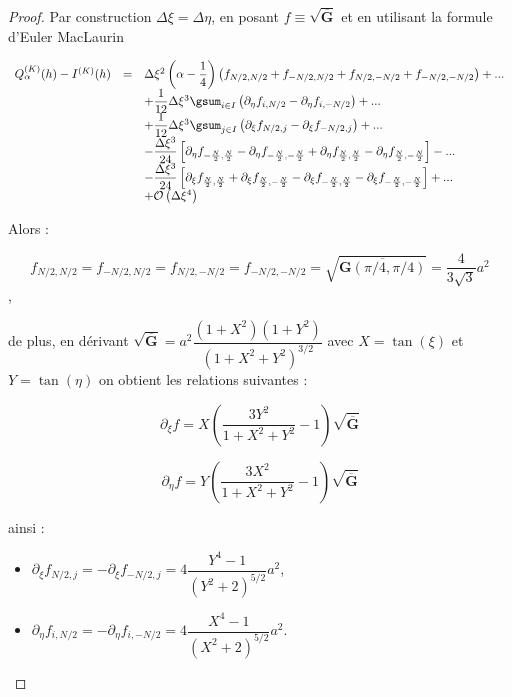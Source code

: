 \begin{proof}

Par construction $\Delta \xi = \Delta \eta$, en posant $f \equiv \sqrt{\overline{\mathbf{G}}}$ et en utilisant la formule d'Euler MacLaurin

\begin{equation}
\begin{array}{rcl}
Q_{\alpha}^{(K)}(h) - I^{(K)}(h) & = & \Delta \xi^2 \left( \alpha - \dfrac{1}{4} \right) \left( f_{N/2,N/2} + f_{-N/2,N/2} + f_{N/2,-N/2} + f_{-N/2,-N/2} \right) +  ... \\
&  & + \dfrac{1}{12} \Delta \xi ^3 \gsum_{i \in I} \left( \partial_{\eta} f_{i,N/2} - \partial_{\eta} f_{i,-N/2} \right) + ...\\
&  & + \dfrac{1}{12} \Delta \xi ^3 \gsum_{j\in I} \left( \partial_{\xi} f_{N/2,j} - \partial_{\xi} f_{-N/2,j} \right) + ... \\
&  & - \dfrac{\Delta \xi^3}{24} \left[ \partial_{\eta} f_{-\frac{N}{2},\frac{N}{2}} - \partial_{\eta} f_{-\frac{N}{2},-\frac{N}{2}} + \partial_{\eta} f_{\frac{N}{2},\frac{N}{2}} -\partial_{\eta} f_{\frac{N}{2},-\frac{N}{2}}  \right] - ... \\
&  & - \dfrac{\Delta \xi^3}{24} \left[ \partial_{\xi} f_{\frac{N}{2},\frac{N}{2}} + \partial_{\xi} f_{\frac{N}{2},-\frac{N}{2}} - \partial_{\xi} f_{-\frac{N}{2},\frac{N}{2}} -\partial_{\xi} f_{-\frac{N}{2},-\frac{N}{2}}  \right] + ... \\
&  & + \mathcal{O}\left( \Delta \xi^4 \right)
 \end{array}
 \label{eq:opimalite alpha 1}
\end{equation}

Alors :

$$f_{N/2,N/2} = f_{-N/2,N/2} = f_{N/2,-N/2} = f_{-N/2,-N/2} =\sqrt{\overline{\mathbf{G}(\pi/4,\pi/4)}} = \dfrac{4}{3 \sqrt{3}} a^2$$,

de plus, en dérivant $\sqrt{\overline{\mathbf{G}}} = a^2 \dfrac{(1+X^2)(1+Y^2)}{(1+X^2+Y^2)^{3/2}}$ avec $X=\tan (\xi)$ et $Y=\tan (\eta)$ on obtient les relations suivantes :

$$\partial_{\xi} f = X \left(\dfrac{3Y^2}{1+X^2+Y^2}-1\right) \sqrt{\overline{\mathbf{G}}}$$

$$\partial_{\eta} f = Y \left(\dfrac{3X^2}{1+X^2+Y^2}-1\right) \sqrt{\overline{\mathbf{G}}}$$

ainsi :

\begin{itemize}
\item $\partial_{\xi} f_{N/2,j} = -\partial_{\xi} f_{-N/2,j} = 4 \dfrac{Y^4-1}{(Y^2+2)^{5/2}} a^2$,
\item $\partial_{\eta} f_{i,N/2} = -\partial_{\eta} f_{i,-N/2} = 4 \dfrac{X^4-1}{(X^2+2)^{5/2}} a^2$.
\end{itemize}


\end{proof}
